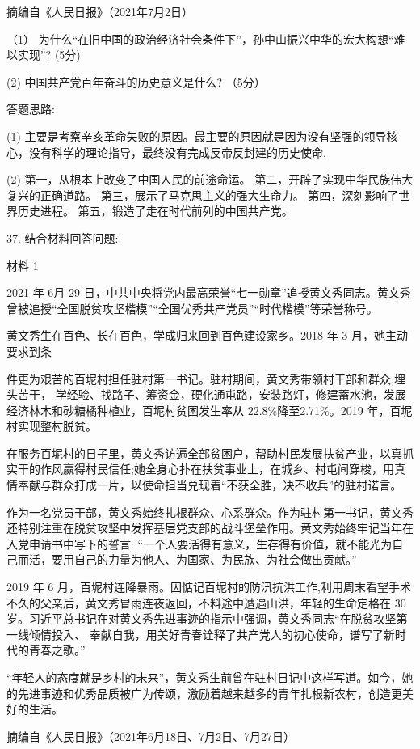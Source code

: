 \documentclass[UTF8,11pt]{ctexart}
\begin{document}
摘编自《人民日报》（2021年7月2日）

（1） 为什么“在旧中国的政治经济社会条件下”，孙中山振兴中华的宏大构想“难以实现”? (5分)

(2) 中国共产党百年奋斗的历史意义是什么? （5分）

答题思路:

(1) 主要是考察辛亥革命失败的原因。最主要的原因就是因为没有坚强的领导核心，没有科学的理论指导，最终没有完成反帝反封建的历史使命.

(2) 第一，从根本上改变了中国人民的前途命运。 第二，开辟了实现中华民族伟大复兴的正确道路。 第三，展示了马克思主义的强大生命力。 第四，深刻影响了世界历史进程。 第五，锻造了走在时代前列的中国共产党。

37. 结合材料回答问题:

材料 1

2021 年 6月 29 日，中共中央将党内最高荣誉“七一勋章”追授黄文秀同志。黄文秀曾被追授“全国脱贫攻坚楷模”“全国优秀共产党员”“时代楷模”等荣誉称号。

黄文秀生在百色、长在百色，学成归来回到百色建设家乡。2018 年 3 月，她主动要求到条

件更为艰苦的百坭村担任驻村第一书记。驻村期间，黄文秀带领村干部和群众,埋头苦干， 学经验、找路子、筹资金，硬化通屯路，安装路灯，修建蓄水池，发展经济林木和砂糖橘种植业，百坭村贫困发生率从 22.8\%降至2.71\%。2019 年，百坭村实现整村脱贫。

在服务百坭村的日子里，黄文秀访遍全部贫困户，帮助村民发展扶贫产业，以真抓实干的作风赢得村民信任;她全身心扑在扶贫事业上，在城乡、村屯间穿梭，用真情奉献与群众打成一片，以使命担当兑现着“不获全胜，决不收兵”的驻村诺言。

作为一名党员干部，黄文秀始终扎根群众、心系群众。作为驻村第一书记，黄文秀还特别注重在脱贫攻坚中发挥基层党支部的战斗堡垒作用。黄文秀始终牢记当年在入党申请书中写下的誓言: “一个人要活得有意义，生存得有价值，就不能光为自己而活，要用自己的力量为他人、为国家、为民族、为社会做出贡献。”

2019 年 6 月，百坭村连降暴雨。因惦记百坭村的防汛抗洪工作,利用周末看望手术不久的父亲后，黄文秀冒雨连夜返回，不料途中遭遇山洪，年轻的生命定格在 30 岁。习近平总书记在对黄文秀先进事迹的指示中强调，黄文秀同志“在脱贫攻坚第一线倾情投入、 奉献自我，用美好青春诠释了共产党人的初心使命，谱写了新时代的青春之歌。”

“年轻人的态度就是乡村的未来”，黄文秀生前曾在驻村日记中这样写道。如今，她的先进事迹和优秀品质被广为传颂，激励着越来越多的青年扎根新农村，创造更美好的生活。

摘编自《人民日报》（2021年6月18日、7月2日、7月27日）
\end{document}
